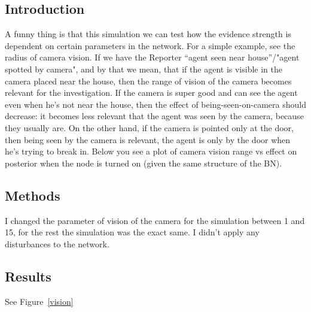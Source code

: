 \subsection{Introduction}
A funny thing is that this simulation we can test how the evidence strength is dependent on certain parameters in the network. For a simple example, see the radius of camera vision. If we have the Reporter ``agent seen near house''/"agent spotted by camera", and by that we mean, that if the agent is visible in the camera placed near the house, then the range of vision of the camera becomes relevant for the investigation. If the camera is super good and can see the agent even when he's not near the house, then the effect of being-seen-on-camera should decrease: it becomes less relevant that the agent was seen by the camera, because they usually are. On the other hand, if the camera is pointed only at the door, then being seen by the camera is relevant, the agent is only by the door when he's trying to break in. Below you see a plot of camera vision range vs effect on posterior when the node is turned on (given the same structure of the BN).

\subsection{Methods}
I changed the parameter of vision of the camera for the simulation between 1 and 15, for the rest the simulation was the exact same. I didn't apply any disturbances to the network.

\subsection{Results}

See Figure~\ref{vision}

